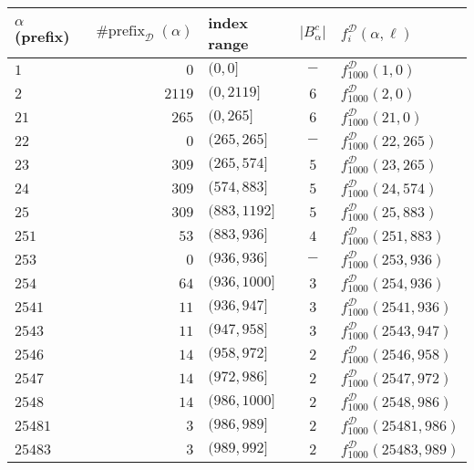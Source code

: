 \begin{table}
\center
\begin{tabular}{|l|r|l|c|l|}
  \hline
  $\alpha$ (prefix)
    & $\operatorname{\#prefix}_\mathcal{D}(\alpha)$
    & index range
    & $|B_\alpha^c|$
    & $f^{\mathcal{D}}_i(\alpha, \ell)$
  \\ \hline
  $1       $ & $0$    & $(0,0]$           & $-$ & $f^{\mathcal{D}}_{1000}(1, 0)$          \\
  $2       $ & $2119$ & $(0,2119]$        & $6$ & $f^{\mathcal{D}}_{1000}(2, 0)$          \\
  \hline
  $21      $ & $265$  & $(0, 265]$        & $6$ & $f^{\mathcal{D}}_{1000}(21, 0)$         \\
  $22      $ & $0$    & $(265, 265]$      & $-$ & $f^{\mathcal{D}}_{1000}(22, 265)$       \\
  $23      $ & $309$  & $(265, 574]$      & $5$ & $f^{\mathcal{D}}_{1000}(23, 265)$       \\
  $24      $ & $309$  & $(574, 883]$      & $5$ & $f^{\mathcal{D}}_{1000}(24, 574)$       \\
  $25      $ & $309$  & $(883, 1192]$     & $5$ & $f^{\mathcal{D}}_{1000}(25, 883)$       \\
  \hline
  $251     $ & $53$   & $(883, 936]$      & $4$ & $f^{\mathcal{D}}_{1000}(251, 883)$      \\
  $253     $ & $0$    & $(936, 936]$      & $-$ & $f^{\mathcal{D}}_{1000}(253, 936)$      \\
  $254     $ & $64$   & $(936, 1000]$     & $3$ & $f^{\mathcal{D}}_{1000}(254, 936)$      \\
  \hline
  $2541    $ & $11$   & $(936, 947]$      & $3$ & $f^{\mathcal{D}}_{1000}(2541, 936)$     \\
  $2543    $ & $11$   & $(947, 958]$      & $3$ & $f^{\mathcal{D}}_{1000}(2543, 947)$     \\
  $2546    $ & $14$   & $(958, 972]$      & $2$ & $f^{\mathcal{D}}_{1000}(2546, 958)$     \\
  $2547    $ & $14$   & $(972, 986]$      & $2$ & $f^{\mathcal{D}}_{1000}(2547, 972)$     \\
  $2548    $ & $14$   & $(986, 1000]$     & $2$ & $f^{\mathcal{D}}_{1000}(2548, 986)$     \\
  \hline
  $25481   $ & $3$    & $(986, 989]$      & $2$ & $f^{\mathcal{D}}_{1000}(25481, 986)$    \\
  $25483   $ & $3$    & $(989, 992]$      & $2$ & $f^{\mathcal{D}}_{1000}(25483, 989)$    \\

\end{tabular}
\end{table}
